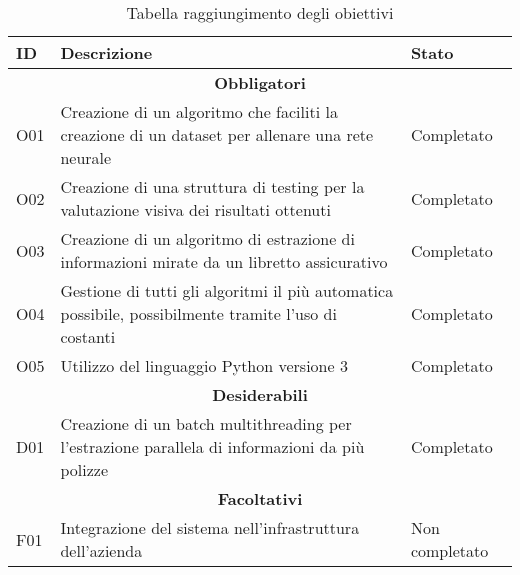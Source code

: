 {
    \def\arraystretch{2}\tabcolsep=10pt
    \begin{table}[!ht]
        \small
        \begin{tabular}{ |p{1cm} |p{7cm}| p{3cm}|}
            \hline
            \textbf{ID} & \textbf{Descrizione} & \textbf{Stato} \\ \hline
            
            \multicolumn{3}{|c|}{\textbf{Obbligatori}} \\ \hline
            
            O01 & Creazione di un algoritmo che faciliti la creazione di un dataset per allenare una rete neurale & Completato \\ \hline
            O02 & Creazione di una struttura di testing per la valutazione visiva dei risultati ottenuti & Completato \\ \hline
            O03 & Creazione di un algoritmo di estrazione di informazioni mirate da un libretto assicurativo & Completato \\ \hline
            O04 & Gestione di tutti gli algoritmi il più automatica possibile, possibilmente tramite l'uso di costanti & Completato \\ \hline
            O05 & Utilizzo del linguaggio Python versione 3 & Completato \\ \hline
            
            \multicolumn{3}{|c|}{\textbf{Desiderabili}} \\ \hline
            
            D01 & Creazione di un batch multithreading per l'estrazione parallela di informazioni da più polizze & Completato \\ \hline
            
            \multicolumn{3}{|c|}{\textbf{Facoltativi}} \\ \hline
            
            F01 & Integrazione del sistema nell'infrastruttura dell'azienda & Non completato \\ \hline
            
        \end{tabular}
        \caption{Tabella raggiungimento degli obiettivi}
    \end{table}
}
\newpage
